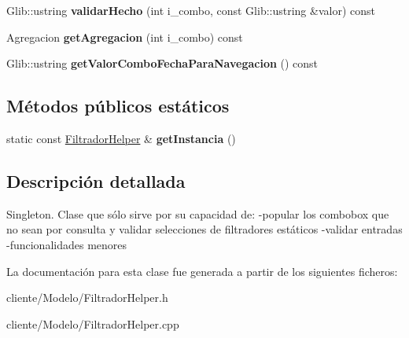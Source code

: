 \begin{DoxyCompactItemize}
\item 
\hypertarget{classFiltradorHelper_aa6a851524b5b9689fe818d641c096e22}{\-Glib\-::ustring {\bfseries validar\-Hecho} (int i\-\_\-combo, const \-Glib\-::ustring \&valor) const }\label{classFiltradorHelper_aa6a851524b5b9689fe818d641c096e22}

\item 
\hypertarget{classFiltradorHelper_a33ea568c98f6c0e715eaf3cc1edc2ed1}{\-Agregacion {\bfseries get\-Agregacion} (int i\-\_\-combo) const }\label{classFiltradorHelper_a33ea568c98f6c0e715eaf3cc1edc2ed1}

\item 
\hypertarget{classFiltradorHelper_a1cb088d7862c15c61ecc7c2471537a82}{\-Glib\-::ustring {\bfseries get\-Valor\-Combo\-Fecha\-Para\-Navegacion} () const }\label{classFiltradorHelper_a1cb088d7862c15c61ecc7c2471537a82}

\end{DoxyCompactItemize}
\subsection*{\-Métodos públicos estáticos}
\begin{DoxyCompactItemize}
\item 
\hypertarget{classFiltradorHelper_adf32e66f6fdc34c0fbfef9c01c55353d}{static const \hyperlink{classFiltradorHelper}{\-Filtrador\-Helper} \& {\bfseries get\-Instancia} ()}\label{classFiltradorHelper_adf32e66f6fdc34c0fbfef9c01c55353d}

\end{DoxyCompactItemize}


\subsection{\-Descripción detallada}
\-Singleton. \-Clase que sólo sirve por su capacidad de\-: -\/popular los combobox que no sean por consulta y validar selecciones de filtradores estáticos -\/validar entradas -\/funcionalidades menores 

\-La documentación para esta clase fue generada a partir de los siguientes ficheros\-:\begin{DoxyCompactItemize}
\item 
cliente/\-Modelo/\-Filtrador\-Helper.\-h\item 
cliente/\-Modelo/\-Filtrador\-Helper.\-cpp\end{DoxyCompactItemize}
